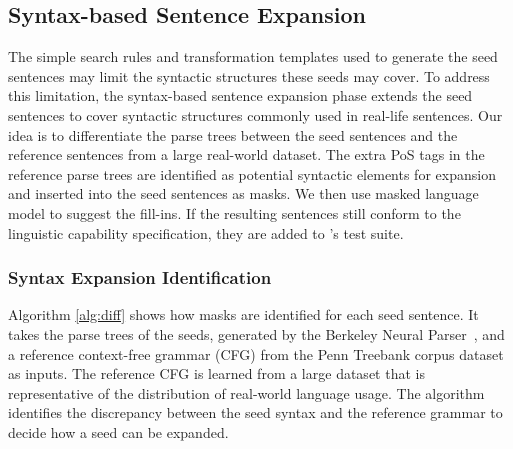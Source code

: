 \subsection{Syntax-based Sentence Expansion}

The simple search rules and transformation templates used to generate
the seed sentences may limit the syntactic structures these seeds may
cover. To address this limitation, the syntax-based sentence expansion
phase extends the seed sentences to cover syntactic structures
commonly used in real-life sentences. Our idea is to differentiate the
parse trees between the seed sentences and the reference sentences
from a large real-world dataset. The extra PoS tags in the reference
parse trees are identified as potential syntactic elements for
expansion and inserted into the seed sentences as masks. We then use
masked language model to suggest the fill-ins. If the resulting
sentences still conform to the linguistic capability specification,
they are added to \tool{}'s test suite. 

\subsubsection{Syntax Expansion Identification}

Algorithm \ref{alg:diff} shows how masks are identified for each seed
sentence.  It takes the parse trees of the seeds, generated by the
Berkeley Neural
Parser~\cite{kitaev2018seedparser,kitaev2019seedparser}, and a
reference context-free grammar (CFG) from the Penn Treebank corpus
dataset \cite{} as inputs.  The reference CFG is learned from a large
dataset \cite{} that is representative of the distribution of
real-world language usage.  The algorithm identifies the discrepancy
between the seed syntax and the reference grammar to decide how a seed
can be expanded.



